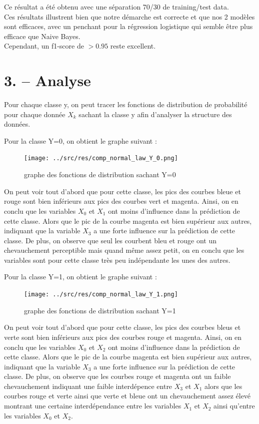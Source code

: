 \documentclass[
]{article}
\begin{document}
Ce résultat a été obtenu avec une séparation 70/30 de training/test
data.\\
Ces résultats illustrent bien que notre démarche est correcte et que nos
2 modèles sont efficaces, avec un penchant pour la régression logistique
qui semble être plus efficace que Naive Bayes.\\
Cependant, un f1-score de \(> 0.95\) reste excellent.

\newpage{}

\section{3. -- Analyse}\label{analyse}

Pour chaque classe y, on peut tracer les fonctions de distribution de
probabilité pour chaque donnée \(X_k\) sachant la classe y afin
d'analyser la structure des données.

Pour la classe Y=0, on obtient le graphe suivant :

\begin{figure}
\centering
\texttt{[image: ../src/res/comp\_normal\_law\_Y\_0.png]}
\caption{graphe des fonctions de distribution sachant Y=0}
\end{figure}

On peut voir tout d'abord que pour cette classe, les pics des courbes
bleue et rouge sont bien inférieurs aux pics des courbes vert et
magenta. Ainsi, on en conclu que les variables \(X_0\) et \(X_1\) ont
moins d'influence dans la prédiction de cette classe. Alors que le pic
de la courbe magenta est bien supérieur aux autres, indiquant que la
variable \(X_3\) a une forte influence sur la prédiction de cette
classe. De plus, on observe que seul les courbent bleu et rouge ont un
chevauchement perceptible mais quand même assez petit, on en conclu que
les variables sont pour cette classe très peu indépendante les unes des
autres.

\newpage{}

Pour la classe Y=1, on obtient le graphe suivant :

\begin{figure}
\centering
\texttt{[image: ../src/res/comp\_normal\_law\_Y\_1.png]}
\caption{graphe des fonctions de distribution sachant Y=1}
\end{figure}

On peut voir tout d'abord que pour cette classe, les pics des courbes
bleus et verte sont bien inférieurs aux pics des courbes rouge et
magenta. Ainsi, on en conclu que les variables \(X_0\) et \(X_2\) ont
moins d'influence dans la prédiction de cette classe. Alors que le pic
de la courbe magenta est bien supérieur aux autres, indiquant que la
variable \(X_3\) a une forte influence sur la prédiction de cette
classe. De plus, on observe que les courbes rouge et magenta ont un
faible chevauchement indiquant une faible interdépence entre \(X_3\) et
\(X_1\) alors que les courbes rouge et verte ainsi que verte et bleue
ont un chevauchement assez élevé montrant une certaine interdépendance
entre les variables \(X_1\) et \(X_2\) ainsi qu'entre les variables
\(X_0\) et \(X_2\).
\end{document}
